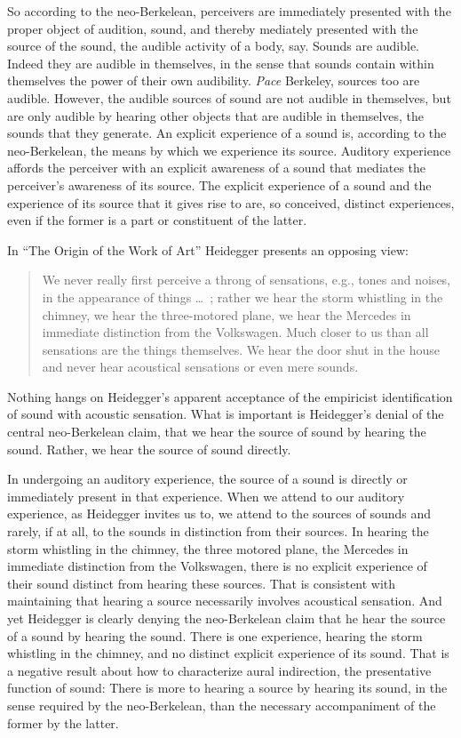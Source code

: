 So according to the neo-Berkelean, perceivers are immediately presented with the proper object of audition, sound, and thereby mediately presented with the source of the sound, the audible activity of a body, say. Sounds are audible. Indeed they are audible in themselves, in the sense that sounds contain within themselves the power of their own audibility. \emph{Pace} Berkeley, sources too are audible. However, the audible sources of sound are not audible in themselves, but are only audible by hearing other objects that are audible in themselves, the sounds that they generate. An explicit experience of a sound is, according to the neo-Berkelean, the means by which we experience its source.  Auditory experience affords the perceiver with an explicit awareness of a sound that mediates the perceiver's awareness of its source. The explicit experience of a sound and the experience of its source that it gives rise to are, so conceived, distinct experiences, even if the former is a part or constituent of the latter.

In ``The Origin of the Work of Art'' Heidegger presents an opposing view:
\begin{quote}
    We never really first perceive a throng of sensations, e.g., tones and noises, in the appearance of things \ldots\ ; rather we hear the storm whistling in the chimney, we hear the three-motored plane, we hear the Mercedes in immediate distinction from the Volkswagen. Much closer to us than all sensations are the things themselves. We hear the door shut in the house and never hear acoustical sensations or even mere sounds. \citep[151--152]{Heidegger:1935uq}
\end{quote}
Nothing hangs on Heidegger's apparent acceptance of the empiricist identification of sound with acoustic sensation. What is important is Heidegger's denial of the central neo-Berkelean claim, that we hear the source of sound by hearing the sound. Rather, we hear the source of sound directly.

In undergoing an auditory experience, the source of a sound is directly or immediately present in that experience. When we attend to our auditory experience, as Heidegger invites us to, we attend to the sources of sounds and rarely, if at all, to the sounds in distinction from their sources. In hearing the storm whistling in the chimney, the three motored plane, the Mercedes in immediate distinction from the Volkswagen, there is no explicit experience of their sound distinct from hearing these sources. That is consistent with maintaining that hearing a source necessarily involves acoustical sensation. And yet Heidegger is clearly denying the neo-Berkelean claim that he hear the source of a sound by hearing the sound. There is one experience, hearing the storm whistling in the chimney, and no distinct explicit experience of its sound. That is a negative result about how to characterize aural indirection, the presentative function of sound: There is more to hearing a source by hearing its sound, in the sense required by the neo-Berkelean, than the necessary accompaniment of the former by the latter.

